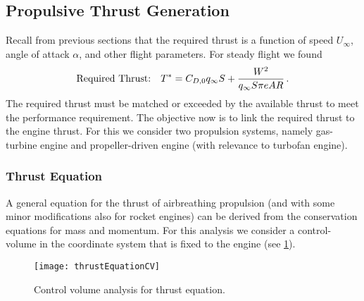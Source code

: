 \subsection{Propulsive Thrust Generation}
Recall from previous sections that the required thrust is a function of speed $U_\infty$, angle of attack $\alpha$, and other flight parameters. For steady flight we  found
\begin{equation}
  \text{Required Thrust:}\quad T^\ast = C_{D,0}q_\infty S + {\frac{W^2}{q_\infty S \pi e AR}} \, \text{.}
\end{equation}
The required thrust must be matched or exceeded by the available thrust to meet the performance requirement. The objective now is to link the required thrust to the engine thrust. For this we consider two propulsion systems, namely gas-turbine engine and propeller-driven engine (with relevance to turbofan engine).

\subsubsection{Thrust Equation}
A general equation for the thrust of airbreathing propulsion (and with some minor modifications also for rocket engines) can be derived from the conservation equations for mass and momentum. For this analysis we consider a control-volume in the coordinate system that is fixed to the engine (see \cref{FIG_CV_ANALYSIS}).

\begin{figure}[!h!]
\begin{center}
 \texttt{[image: thrustEquationCV]}
 \caption{\label{FIG_CV_ANALYSIS}Control volume analysis for thrust equation.}
\end{center}
\end{figure}

